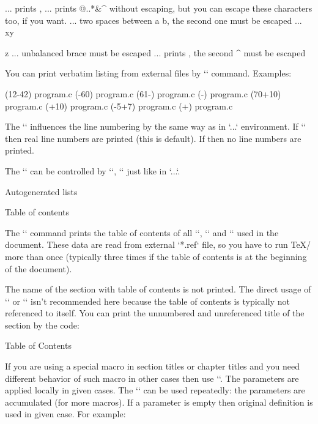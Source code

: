 \begtt
\code{\\text, \%\#} ... prints \text, %
  ... prints @{..}*&^$ $ without escaping, but you can
                        escape these characters too, if you want.
        ... two spaces between a  b, the second one must be escaped
        ... xy{z ... unbalanced brace must be escaped
         ... prints ^^M, the second ^ must be escaped
\endtt

You can print verbatim listing from external files by `\verbinput` command. 
Examples:

\begtt
\verbinput (12-42) program.c  %
\verbinput (-60) program.c    % print from begin to the line 60
\verbinput (61-) program.c    % from line 61 to the end
\verbinput (-) program.c      % whole file is printed
\verbinput (70+10) program.c  % from line 70, only 10 lines printed
\verbinput (+10) program.c    % from the last line read, print 10 lines 
\verbinput (-5+7) program.c   % from the last line read, skip 5, print 7
\verbinput (+) program.c      % from the last line read to the end
\endtt


The `\ttline` influences the line numbering by the same way as in
`\begtt...\endtt` environment. If `` then real line numbers are
printed (this is default). If  then no line 
numbers are printed.

The `\verbinput` can be controlled by `\everytt`, `\ttindent` just like
in `\begtt...\endtt`.


\sec Autogenerated lists

\secc[toc] Table of contents

The `\maketoc` command prints the table of contents of all `\chap`, `\sec`
and `\secc` used in the document. These data are read from external `*.ref` file, so
you have to run \TeX/ more than once (typically three times if the table of
contents is at the beginning of the document). 

The name of the section with table of contents is not printed. The direct usage
of `\chap` or `\sec` isn't recommended here because the table of contents 
is typically not referenced to itself. You can print the unnumbered and unreferenced
title of the section by the code:

\begtt
\nonum\notoc\sec Table of Contents
\endtt

\new
If you are using a special macro in section titles or chapter titles 
and you need different behavior of such macro in other cases then use 
``.
The parameters are applied locally in given cases. The `\regmacro` can be
used repeatedly: the parameters are accumulated (for more macros). 
If a parameter is empty then original definition is used in given case.
For example:

}
